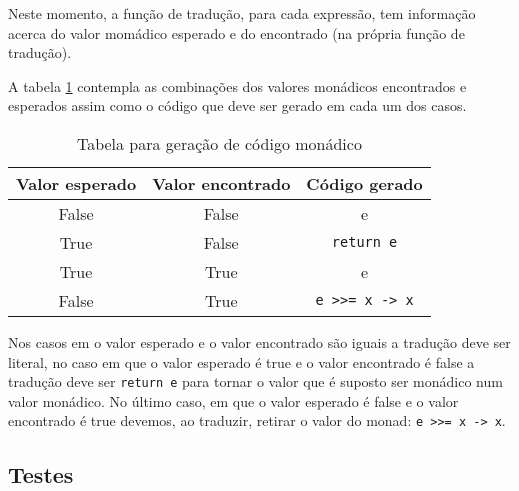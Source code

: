 Neste momento, a função de tradução, para cada expressão, tem informação acerca do valor momádico esperado e do encontrado (na própria função de tradução).

A tabela \ref{tab:monad} contempla as combinações dos valores monádicos encontrados e esperados assim como o código que deve ser gerado em cada um dos casos.

\begin{table}
\begin{center}
  \begin{tabular}[h!]{| c | c | c |}
    \hline  
    \quad Valor esperado \quad&\quad Valor encontrado \quad&\quad Código gerado \quad\\\hline
    False & False & e \\
    True & False & \lstinline"return e" \\
    True & True & e \\
    False & True & \lstinline"e >>= x -> x" \\
    \hline
  \end{tabular}
  \vspace{0.2cm}
  \caption{Tabela para geração de código monádico}
  \label{tab:monad}
\end{center}
\end{table}

Nos casos em o valor esperado e o valor encontrado são iguais a tradução deve ser literal, no caso em que o valor esperado é true e o valor encontrado é false a tradução deve ser \lstinline"return e" para tornar o valor que é suposto ser monádico num valor monádico. No último caso, em que o valor esperado é false e o valor encontrado é true devemos, ao traduzir, retirar o valor do monad: \lstinline"e >>= x -> x".

\subsection{Testes}

\\
\\


